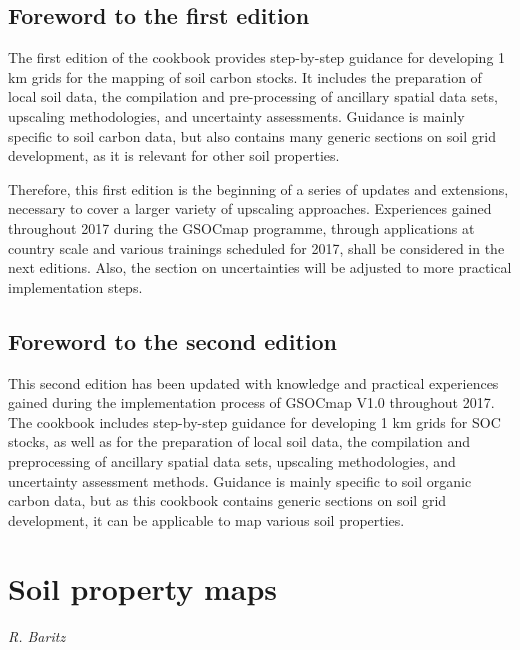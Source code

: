 \documentclass[10pt,b5paper,]{book}
\theoremstyle{definition}
\theoremstyle{definition}
\theoremstyle{definition}
\theoremstyle{remark}
\begin{document}
\hypertarget{foreword-to-the-first-edition}{%
\section{Foreword to the first
edition}\label{foreword-to-the-first-edition}}

The first edition of the cookbook provides step-by-step guidance for
developing 1 km grids for the mapping of soil carbon stocks. It includes
the preparation of local soil data, the compilation and pre-processing
of ancillary spatial data sets, upscaling methodologies, and uncertainty
assessments. Guidance is mainly specific to soil carbon data, but also
contains many generic sections on soil grid development, as it is
relevant for other soil properties.

Therefore, this first edition is the beginning of a series of updates
and extensions, necessary to cover a larger variety of upscaling
approaches. Experiences gained throughout 2017 during the GSOCmap
programme, through applications at country scale and various trainings
scheduled for 2017, shall be considered in the next editions. Also, the
section on uncertainties will be adjusted to more practical
implementation steps.

\hypertarget{foreword-to-the-second-edition}{%
\section{Foreword to the second
edition}\label{foreword-to-the-second-edition}}

This second edition has been updated with knowledge and practical
experiences gained during the implementation process of GSOCmap V1.0
throughout 2017. The cookbook includes step-by-step guidance for
developing 1 km grids for SOC stocks, as well as for the preparation of
local soil data, the compilation and preprocessing of ancillary spatial
data sets, upscaling methodologies, and uncertainty assessment methods.
Guidance is mainly specific to soil organic carbon data, but as this
cookbook contains generic sections on soil grid development, it can be
applicable to map various soil properties.

\hypertarget{soil-property-maps}{%
\chapter{Soil property maps}\label{soil-property-maps}}

\emph{R. Baritz}
\end{document}
